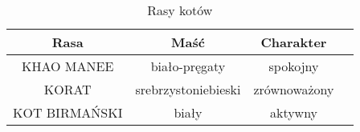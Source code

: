 \begin{table}
\caption{Rasy kotów}
\label{tab:Rasy_kotów}
\begin{center}
\begin{tabular}{|c||c|c|c|}
\hline Rasa & Maść & Charakter \\ \hline \hline
KHAO MANEE & biało-pręgaty & spokojny \\ \hline
KORAT & srebrzystoniebieski & zrównoważony \\ \hline
KOT BIRMAŃSKI & biały & aktywny  \\ \hline
\end{tabular}
\end{center}
\end{table}

